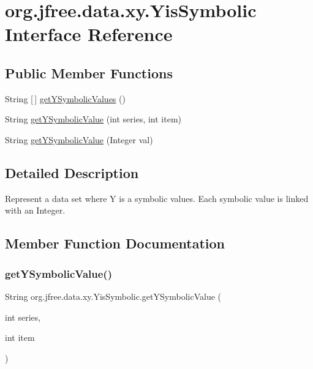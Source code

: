 \hypertarget{interfaceorg_1_1jfree_1_1data_1_1xy_1_1_yis_symbolic}{}\section{org.\+jfree.\+data.\+xy.\+Yis\+Symbolic Interface Reference}
\label{interfaceorg_1_1jfree_1_1data_1_1xy_1_1_yis_symbolic}
\subsection*{Public Member Functions}
\begin{DoxyCompactItemize}
\item 
String \mbox{[}$\,$\mbox{]} \mbox{\hyperlink{interfaceorg_1_1jfree_1_1data_1_1xy_1_1_yis_symbolic_af964830a0f66c63c671df4d347b16fc3}{get\+Y\+Symbolic\+Values}} ()
\item 
String \mbox{\hyperlink{interfaceorg_1_1jfree_1_1data_1_1xy_1_1_yis_symbolic_a2a78ebded2698a6cb74d6ae15355b25c}{get\+Y\+Symbolic\+Value}} (int series, int item)
\item 
String \mbox{\hyperlink{interfaceorg_1_1jfree_1_1data_1_1xy_1_1_yis_symbolic_a922b9681be541b311e32ddb7fc3430c9}{get\+Y\+Symbolic\+Value}} (Integer val)
\end{DoxyCompactItemize}


\subsection{Detailed Description}
Represent a data set where Y is a symbolic values. Each symbolic value is linked with an Integer. 

\subsection{Member Function Documentation}
\mbox{\label{interfaceorg_1_1jfree_1_1data_1_1xy_1_1_yis_symbolic_a2a78ebded2698a6cb74d6ae15355b25c}} 
\subsubsection{\texorpdfstring{get\+Y\+Symbolic\+Value()}{getYSymbolicValue()}\hspace{0.1cm}{\footnotesize\ttfamily [1/2]}}
{\footnotesize\ttfamily String org.\+jfree.\+data.\+xy.\+Yis\+Symbolic.\+get\+Y\+Symbolic\+Value (\begin{DoxyParamCaption}\item[{int}]{series,  }\item[{int}]{item }\end{DoxyParamCaption})}

